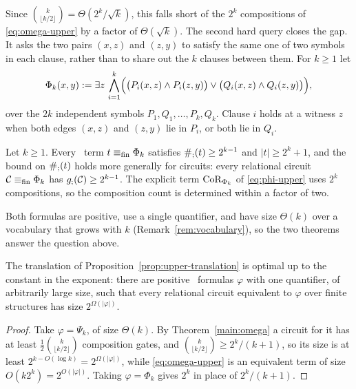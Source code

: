 Since $\binom{k}{\lfloor k/2\rfloor}=\Theta(2^k/\sqrt k)$, this falls short
of the $2^k$ compositions of \eqref{eq:omega-upper} by a factor of
$\Theta(\sqrt k)$. The second hard query closes the gap. It asks
the two pairs $(x,z)$ and $(z,y)$ to satisfy the
same one of two symbols in each clause, rather than to share out the $k$
clauses between them. For $k\ge1$
let
\begin{equation}\label{eq:phi}
\Phi_k(x,y) := \exists z\,\bigwedge_{i=1}^k
       \Bigl(\bigl(P_i(x,z)\land P_i(z,y)\bigr)\lor
             \bigl(Q_i(x,z)\land Q_i(z,y)\bigr)\Bigr),
\end{equation}
over the $2k$ independent symbols $P_1,Q_1,\ldots,P_k,Q_k$. Clause $i$ holds
at a witness $z$ when both edges $(x,z)$ and $(z,y)$ lie in $P_i$, or both
lie in $Q_i$.

\begin{theorem}\label{main:phi}
Let $k\ge1$. Every \CoR\ term $t\equiv_{\rm fin}\Phi_k$ satisfies
$\#_{;}(t)\ge2^{k-1}$ and $|t|\ge2^k+1$, and the bound on $\#_{;}(t)$ holds
more
generally for circuits: every relational circuit
$\mathcal C\equiv_{\rm fin}\Phi_k$ has $g_{;}(\mathcal C)\ge2^{k-1}$. The explicit
term $\mathrm{CoR}_{\Phi_k}$ of \eqref{eq:phi-upper} uses $2^k$ compositions, so the
composition count
is determined within a factor of two.
\end{theorem}

Both formulas are positive, use a single quantifier, and have size
$\Theta(k)$ over a vocabulary that grows with $k$
(Remark~\ref{rem:vocabulary}), so the two theorems answer the question
above.

\begin{corollary}\label{cor:gap}
The translation of Proposition~\ref{prop:upper-translation} is optimal up to
the constant in the exponent: there are positive \FOthree\ formulas
$\varphi$ with one quantifier, of arbitrarily large size, such that every
relational circuit equivalent to $\varphi$ over finite structures has size
$2^{\Omega(|\varphi|)}$.
\end{corollary}
\begin{proof}
Take $\varphi=\Psi_k$, of size $\Theta(k)$. By Theorem~\ref{main:omega} a
circuit for it has at least $\frac12\binom{k}{\lfloor k/2\rfloor}$
composition gates, and $\binom{k}{\lfloor k/2\rfloor}\ge2^k/(k+1)$, so its
size is at least $2^{k-O(\log k)}=2^{\Omega(|\varphi|)}$, while
\eqref{eq:omega-upper} is an equivalent term of size
$O(k2^k)=2^{O(|\varphi|)}$. Taking $\varphi=\Phi_k$
gives $2^k$ in place of $2^k/(k+1)$.
\end{proof}


